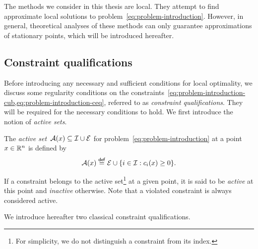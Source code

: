 The methods we consider in this thesis are local.
They attempt to find approximate local solutions to problem~\cref{eq:problem-introduction}.
However, in general, theoretical analyses of these methods can only guarantee approximations of stationary points, which will be introduced hereafter.

\subsection{Constraint qualifications}

Before introducing any necessary and sufficient conditions for local optimality, we discuss some regularity conditions on the constraints~\cref{eq:problem-introduction-cub,eq:problem-introduction-ceq}, referred to as \emph{constraint qualifications}.
They will be required for the necessary conditions to hold.
We first introduce the notion of \emph{active sets}.

\begin{definition}
    \label{def:active-set}
    The \emph{active set}~$\act(\iter) \subseteq \iub \cup \ieq$ for problem~\cref{eq:problem-introduction} at a point~$\iter \in \R^n$ is defined by
    \begin{equation*}
        \act(\iter) \eqdef \ieq \cup \set{i \in \iub : \con{i}(\iter) \ge 0}.
    \end{equation*}
\end{definition}

If a constraint belongs to the active set\footnote{For simplicity, we do not distinguish a constraint from its index.} at a given point, it is said to be \emph{active} at this point and \emph{inactive} otherwise.
Note that a violated constraint is always considered active.

We introduce hereafter two classical constraint qualifications.

